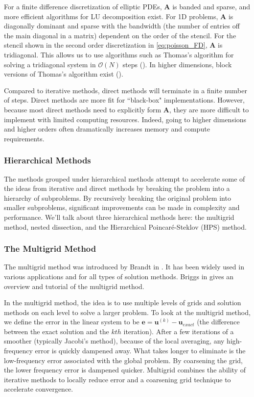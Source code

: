 For a finite difference discretization of elliptic PDEs, $\textbf{A}$ is banded and sparse, and more efficient algorithms for LU decomposition exist. For 1D problems, $\textbf{A}$ is diagonally dominant and sparse with the bandwidth (the number of entries off the main diagonal in a matrix) dependent on the order of the stencil. For the stencil shown in the second order discretization in \ref{eq:poisson_FD}, $\textbf{A}$ is tridiagonal. This allows us to use algorithms such as Thomas's algorithm for solving a tridiagonal system in $\mathcal{O}(N)$ steps (\citep{higham2002accuracy}). In higher dimensions, block versions of Thomas's algorithm exist (\citep{quarteroni2010numerical}).

Compared to iterative methods, direct methods will terminate in a finite number of steps. Direct methods are more fit for ``black-box" implementations. However, because most direct methods need to explicitly form $\textbf{A}$, they are more difficult to implement with limited computing resources. Indeed, going to higher dimensions and higher orders often dramatically increases memory and compute requirements.

\subsubsection{Hierarchical Methods}
\label{sub:hierarchical-methods}

The methods grouped under hierarchical methods attempt to accelerate some of the ideas from iterative and direct methods by breaking the problem into a hierarchy of subproblems. By recursively breaking the original problem into smaller subproblems, significant improvements can be made in complexity and performance. We'll talk about three hierarchical methods here: the multigrid method, nested dissection, and the Hierarchical Poincaré-Steklov (HPS) method.

\subsubsection{The Multigrid Method}
\label{subsub:multigrid-method}

The multigrid method was introduced by Brandt in \citep{brandt1977multi}. It has been widely used in various applications and for all types of solution methods. Briggs in \citep{briggs2000multigrid} gives an overview and tutorial of the multigrid method.

In the multigrid method, the idea is to use multiple levels of grids and solution methods on each level to solve a larger problem. To look at the multigrid method, we define the error in the linear system to be $\textbf{e} = \textbf{u}^{(k)} - \textbf{u}_{exact}$ (the difference between the exact solution and the $kth$ iteration). After a few iterations of a smoother (typically Jacobi's method), because of the local averaging, any high-frequency error is quickly dampened away. What takes longer to eliminate is the low-frequency error associated with the global problem. By coarsening the grid, the lower frequency error is dampened quicker. Multigrid combines the ability of iterative methods to locally reduce error and a coarsening grid technique to accelerate convergence.

